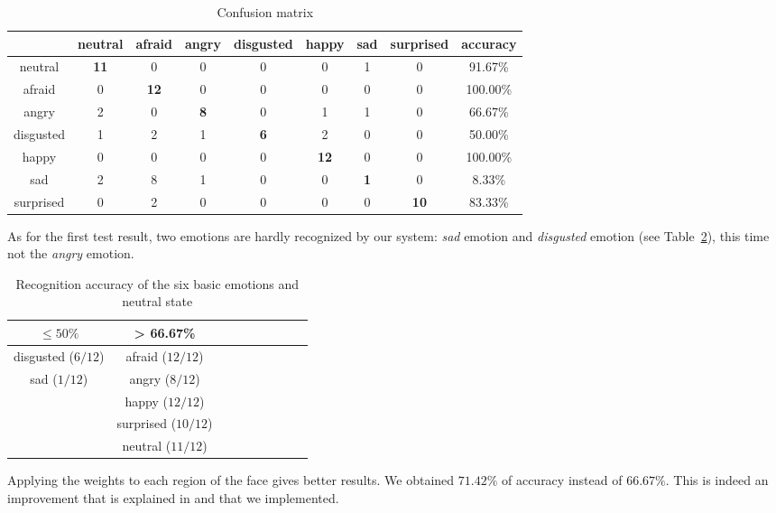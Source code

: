 \begin{table}[h]
\begin{center}
   \caption{\label{table_results_confusion_matrix_weight} Confusion matrix}
\begin{tabular}{|c|c|c|c|c|c|c|c|c|}
  \hline
   & neutral & afraid & angry & disgusted & happy & sad & surprised & accuracy \\
  \hline
  neutral & \textbf{11} & 0 & 0 & 0 & 0 & 1 & 0 & 91.67\% \\
  afraid & 0 & \textbf{12} & 0 & 0 & 0 & 0 & 0 & 100.00\% \\
  angry & 2 & 0 & \textbf{8} & 0 & 1 & 1 & 0 & 66.67\% \\
  disgusted & 1 & 2 & 1 & \textbf{6} & 2 & 0 & 0 & 50.00\% \\
  happy & 0 & 0 & 0 & 0 & \textbf{12} & 0 & 0 & 100.00\% \\
  sad & 2 & 8 & 1 & 0 & 0 & \textbf{1} & 0 & 8.33\% \\
  surprised & 0 & 2 & 0 & 0 & 0 & 0 & \textbf{10} & 83.33\%\\
  \hline
\end{tabular}
\end{center}
\end{table}

\noindent As for the first test result, two emotions are hardly recognized by our system: \textit{sad} emotion and \textit{disgusted} emotion (see Table~\ref{table_results_accuracy_weight}), this time not the \textit{angry} emotion.
\newline

\begin{table}[h]
\begin{center}
   \caption{\label{table_results_accuracy_weight} Recognition accuracy of the six basic emotions and neutral state}
\begin{tabular}{|c|c|c|c|c|c|c|c|c|}
  \hline
   $ \leq 50\% $ & > 66.67\% \\
  \hline
  disgusted ($ 6/12 $) & afraid ($ 12/12 $) \\
  sad ($ 1/12 $) & angry ($ 8/12 $) \\
   & happy ($ 12/12 $) \\
   & surprised ($ 10/12 $) \\
   & neutral ($ 11/12 $) \\
  \hline
\end{tabular}
\end{center} 
\end{table}

\noindent Applying the weights to each region of the face gives better results. We obtained $ 71.42\% $ of accuracy instead of $ 66.67\% $. This is indeed an improvement that is explained in \cite{GAN08} and that we implemented.
\newline
